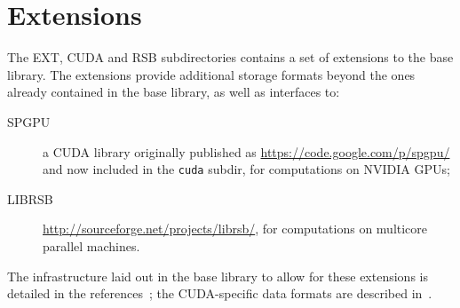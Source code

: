 \section{Extensions}\label{sec:ext-intro}

The EXT, CUDA and RSB  subdirectories contains a set of extensions to the base
library. The extensions provide additional storage formats beyond the
ones already contained in the base library, as well as interfaces
to:
\begin{description}
\item[SPGPU] a CUDA library originally published as
  \url{https://code.google.com/p/spgpu/} and now included in the
  \verb|cuda| subdir, for computations on   NVIDIA GPUs;
\item[LIBRSB] \url{http://sourceforge.net/projects/librsb/}, for
  computations on multicore parallel machines. 
\end{description}
The infrastructure laid out in the base library to allow for these
extensions is detailed in the references~\cite{DesPat:11,CaFiRo:2014,Sparse03};
the CUDA-specific data formats are described in~\cite{OurTechRep}. 


